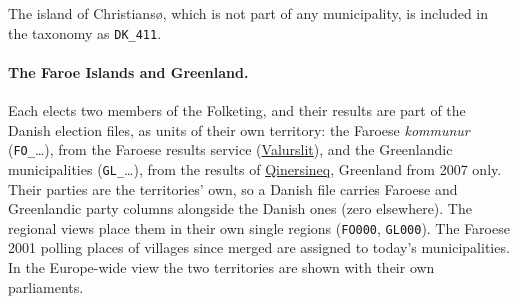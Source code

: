 The island of Christiansø, which is not part of any municipality, is included
in the taxonomy as \texttt{DK\_411}.

\paragraph{The Faroe Islands and Greenland.}  Each elects two members of the
Folketing, and their results are part of the Danish election files, as units
of their own territory: the Faroese \textit{kommunur} (\texttt{FO\_}\ldots),
from the Faroese results service (\href{https://www.valurslit.fo}{Valurslit}),
and the Greenlandic municipalities (\texttt{GL\_}\ldots), from the results of
\href{https://qinersineq.gl}{Qinersineq}, Greenland from 2007 only.  Their
parties are the territories' own, so a Danish file carries Faroese and
Greenlandic party columns alongside the Danish ones (zero elsewhere).  The
regional views place them in their own single regions (\texttt{FO000},
\texttt{GL000}).  The Faroese 2001 polling places of villages since merged are
assigned to today's municipalities.  In the Europe-wide view the two
territories are shown with their own parliaments.

